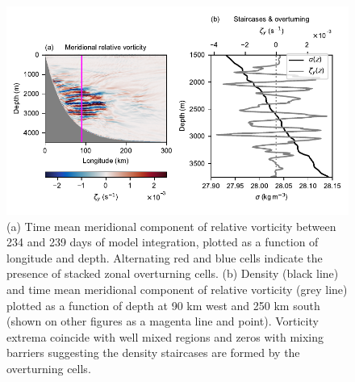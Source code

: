 \begin{figure}
    \centering
    \includegraphics{../figures/Figure3.pdf}
    \caption{(a) Time mean meridional component of relative vorticity between 234 and 239 days of model integration, plotted as a function of longitude and depth. Alternating red and blue cells indicate the presence of stacked zonal overturning cells. (b) Density (black line) and time mean meridional component of relative vorticity (grey line) plotted as a function of depth at 90 km west and 250 km south (shown on other figures as a magenta line and point). Vorticity extrema coincide with well mixed regions and zeros with mixing barriers suggesting the density staircases are formed by the overturning cells.}
    \label{fig:StaircaseMechanism}
\end{figure}

